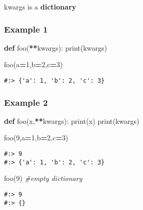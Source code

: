 \documentclass[
]{book}
\newenvironment{Shaded}{\begin{snugshade}}{\end{snugshade}}
\newcommand{\BuiltInTok}[1]{#1}
\newcommand{\CommentTok}[1]{\textcolor[rgb]{0.37,0.37,0.37}{\textit{#1}}}
\newcommand{\DecValTok}[1]{\textcolor[rgb]{0.06,0.06,0.06}{#1}}
\newcommand{\KeywordTok}[1]{\textcolor[rgb]{0.27,0.27,0.27}{\textbf{#1}}}
\newcommand{\NormalTok}[1]{#1}
\newcommand{\OperatorTok}[1]{\textcolor[rgb]{0.43,0.43,0.43}{\textbf{#1}}}
\begin{document}
kwargs is a \textbf{dictionary}

\hypertarget{example-1-1}{%
\subsubsection{Example 1}\label{example-1-1}}

\begin{Shaded}
\begin{Highlighting}[]
\KeywordTok{def}\NormalTok{ foo(}\OperatorTok{**}\NormalTok{kwargs):}
    \BuiltInTok{print}\NormalTok{(kwargs)}
    
\NormalTok{foo(a}\OperatorTok{=}\DecValTok{1}\NormalTok{,b}\OperatorTok{=}\DecValTok{2}\NormalTok{,c}\OperatorTok{=}\DecValTok{3}\NormalTok{)}
\end{Highlighting}
\end{Shaded}

\begin{verbatim}
#:> {'a': 1, 'b': 2, 'c': 3}
\end{verbatim}

\hypertarget{example-2-1}{%
\subsubsection{Example 2}\label{example-2-1}}

\begin{Shaded}
\begin{Highlighting}[]
\KeywordTok{def}\NormalTok{ foo(x,}\OperatorTok{**}\NormalTok{kwargs):}
    \BuiltInTok{print}\NormalTok{(x)}
    \BuiltInTok{print}\NormalTok{(kwargs)}
    
\NormalTok{foo(}\DecValTok{9}\NormalTok{,a}\OperatorTok{=}\DecValTok{1}\NormalTok{,b}\OperatorTok{=}\DecValTok{2}\NormalTok{,c}\OperatorTok{=}\DecValTok{3}\NormalTok{)}
\end{Highlighting}
\end{Shaded}

\begin{verbatim}
#:> 9
#:> {'a': 1, 'b': 2, 'c': 3}
\end{verbatim}

\begin{Shaded}
\begin{Highlighting}[]
\NormalTok{foo(}\DecValTok{9}\NormalTok{) }\CommentTok{\#empty dictionary}
\end{Highlighting}
\end{Shaded}

\begin{verbatim}
#:> 9
#:> {}
\end{verbatim}
\end{document}
